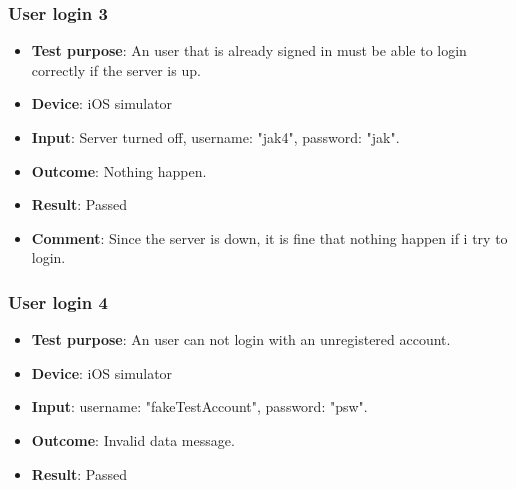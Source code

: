 \documentclass[../ATD.tex]{subfiles}
\begin{document}
    \subsubsection{User login 3}\label{subsubsec:user-login-3}
    \begin{itemize}
        \item \textbf{Test purpose}: An user that is already signed in must be able to login correctly if the server is up.
        \item \textbf{Device}: iOS simulator
        \item \textbf{Input}: Server turned off, username: "jak4", password: "jak".
        \item \textbf{Outcome}: Nothing happen.
        \item \textbf{Result}: Passed
        \item \textbf{Comment}: Since the server is down, it is fine that nothing happen if i try to login.
    \end{itemize}

    \subsubsection{User login 4}\label{subsubsec:user-login-4}
    \begin{itemize}
        \item \textbf{Test purpose}: An user can not login with an unregistered account.
        \item \textbf{Device}: iOS simulator
        \item \textbf{Input}: username: "fakeTestAccount", password: "psw".
        \item \textbf{Outcome}: Invalid data message.
        \item \textbf{Result}: Passed
    \end{itemize}
\end{document}
